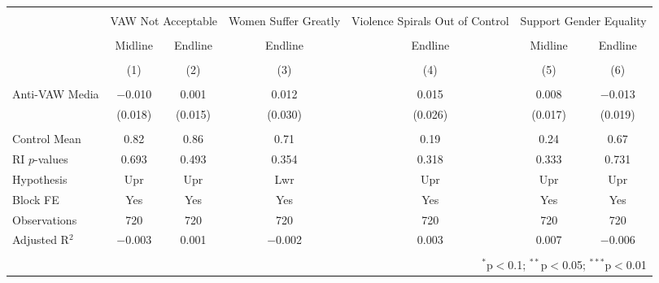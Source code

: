 
\begin{tabular}{@{\extracolsep{5pt}}lcccccc} 
\\[-1.8ex]\hline 
\hline \\[-1.8ex] 
 & \multicolumn{2}{c}{VAW Not Acceptable} & Women Suffer Greatly & Violence Spirals Out of Control & \multicolumn{2}{c}{Support Gender Equality} \\ 
\\[-1.8ex] & Midline & Endline & Endline & Endline & Midline & Endline \\ 
\\[-1.8ex] & (1) & (2) & (3) & (4) & (5) & (6)\\ 
\hline \\[-1.8ex] 
 Anti-VAW Media & $-$0.010 & 0.001 & 0.012 & 0.015 & 0.008 & $-$0.013 \\ 
  & (0.018) & (0.015) & (0.030) & (0.026) & (0.017) & (0.019) \\ 
 \hline \\[-1.8ex] 
Control Mean & 0.82 & 0.86 & 0.71 & 0.19 & 0.24 & 0.67 \\ 
RI $p$-values & 0.693 & 0.493 & 0.354 & 0.318 & 0.333 & 0.731 \\ 
Hypothesis & Upr & Upr & Lwr & Upr & Upr & Upr \\ 
Block FE & Yes & Yes & Yes & Yes & Yes & Yes \\ 
Observations & 720 & 720 & 720 & 720 & 720 & 720 \\ 
Adjusted R$^{2}$ & $-$0.003 & 0.001 & $-$0.002 & 0.003 & 0.007 & $-$0.006 \\ 
\hline 
\hline \\[-1.8ex] 
\multicolumn{7}{r}{$^{*}$p$<$0.1; $^{**}$p$<$0.05; $^{***}$p$<$0.01} \\ 
\end{tabular} 

